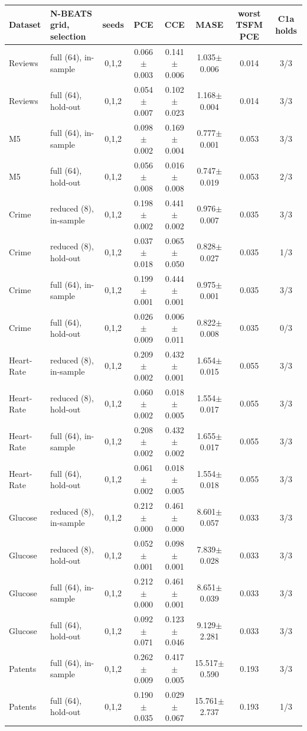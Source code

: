 \begin{tabular}{llcccccc}
\toprule
Dataset & N-BEATS grid, selection & seeds & PCE & CCE & MASE & worst TSFM PCE & C1a holds \\
\midrule
Reviews & full (64), in-sample & 0,1,2 & 0.066$\pm$0.003 & 0.141$\pm$0.006 & 1.035$\pm$0.006 & 0.014 & 3/3 \\
Reviews & full (64), hold-out & 0,1,2 & 0.054$\pm$0.007 & 0.102$\pm$0.023 & 1.168$\pm$0.004 & 0.014 & 3/3 \\
M5 & full (64), in-sample & 0,1,2 & 0.098$\pm$0.002 & 0.169$\pm$0.004 & 0.777$\pm$0.001 & 0.053 & 3/3 \\
M5 & full (64), hold-out & 0,1,2 & 0.056$\pm$0.008 & 0.016$\pm$0.008 & 0.747$\pm$0.019 & 0.053 & 2/3 \\
Crime & reduced (8), in-sample & 0,1,2 & 0.198$\pm$0.002 & 0.441$\pm$0.002 & 0.976$\pm$0.007 & 0.035 & 3/3 \\
Crime & reduced (8), hold-out & 0,1,2 & 0.037$\pm$0.018 & 0.065$\pm$0.050 & 0.828$\pm$0.027 & 0.035 & 1/3 \\
Crime & full (64), in-sample & 0,1,2 & 0.199$\pm$0.001 & 0.444$\pm$0.001 & 0.975$\pm$0.001 & 0.035 & 3/3 \\
Crime & full (64), hold-out & 0,1,2 & 0.026$\pm$0.009 & 0.006$\pm$0.011 & 0.822$\pm$0.008 & 0.035 & 0/3 \\
Heart-Rate & reduced (8), in-sample & 0,1,2 & 0.209$\pm$0.002 & 0.432$\pm$0.001 & 1.654$\pm$0.015 & 0.055 & 3/3 \\
Heart-Rate & reduced (8), hold-out & 0,1,2 & 0.060$\pm$0.002 & 0.018$\pm$0.005 & 1.554$\pm$0.017 & 0.055 & 3/3 \\
Heart-Rate & full (64), in-sample & 0,1,2 & 0.208$\pm$0.002 & 0.432$\pm$0.002 & 1.655$\pm$0.017 & 0.055 & 3/3 \\
Heart-Rate & full (64), hold-out & 0,1,2 & 0.061$\pm$0.002 & 0.018$\pm$0.005 & 1.554$\pm$0.018 & 0.055 & 3/3 \\
Glucose & reduced (8), in-sample & 0,1,2 & 0.212$\pm$0.000 & 0.461$\pm$0.000 & 8.601$\pm$0.057 & 0.033 & 3/3 \\
Glucose & reduced (8), hold-out & 0,1,2 & 0.052$\pm$0.001 & 0.098$\pm$0.001 & 7.839$\pm$0.028 & 0.033 & 3/3 \\
Glucose & full (64), in-sample & 0,1,2 & 0.212$\pm$0.000 & 0.461$\pm$0.001 & 8.651$\pm$0.039 & 0.033 & 3/3 \\
Glucose & full (64), hold-out & 0,1,2 & 0.092$\pm$0.071 & 0.123$\pm$0.046 & 9.129$\pm$2.281 & 0.033 & 3/3 \\
Patents & full (64), in-sample & 0,1,2 & 0.262$\pm$0.009 & 0.417$\pm$0.005 & 15.517$\pm$0.590 & 0.193 & 3/3 \\
Patents & full (64), hold-out & 0,1,2 & 0.190$\pm$0.035 & 0.029$\pm$0.067 & 15.761$\pm$2.737 & 0.193 & 1/3 \\
\bottomrule
\end{tabular}
